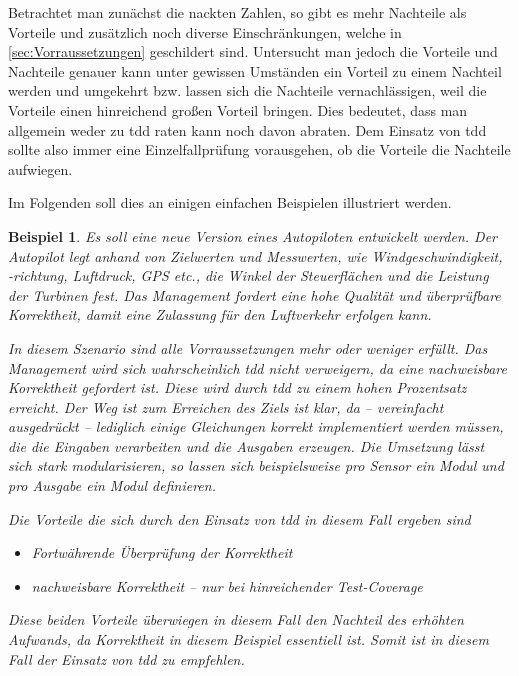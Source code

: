 \documentclass[a4paper,10pt]{scrartcl}
\newtheorem{beispiel}{Beispiel}[section]
\begin{document}
Betrachtet man zunächst die nackten Zahlen, so gibt es mehr Nachteile als 
Vorteile und zusätzlich noch diverse Einschränkungen, welche in \autoref{sec:Vorraussetzungen}
geschildert sind. Untersucht man jedoch die Vorteile und Nachteile genauer
kann unter gewissen Umständen ein Vorteil zu einem Nachteil werden und
umgekehrt bzw. lassen sich die Nachteile vernachlässigen, weil die Vorteile
einen hinreichend großen Vorteil bringen. Dies bedeutet, dass man allgemein 
weder zu \gls{tdd} raten kann noch davon abraten. Dem Einsatz von \gls{tdd}
sollte also immer eine Einzelfallprüfung vorausgehen, ob die Vorteile die
Nachteile aufwiegen.

Im Folgenden soll dies an einigen einfachen Beispielen illustriert werden.

\begin{beispiel}
  \textit{Es soll eine neue Version eines Autopiloten entwickelt werden. Der Autopilot 
  legt anhand von Zielwerten und Messwerten, wie Windgeschwindigkeit, -richtung, Luftdruck,
  GPS etc., die Winkel der Steuerflächen und die Leistung der Turbinen fest. Das 
  Management fordert eine hohe Qualität und überprüfbare Korrektheit, damit eine 
  Zulassung für den Luftverkehr erfolgen kann.}

  In diesem Szenario sind alle Vorraussetzungen mehr oder weniger erfüllt. Das
  Management wird sich wahrscheinlich \gls{tdd} nicht verweigern, da eine
  nachweisbare Korrektheit gefordert ist. Diese wird durch \gls{tdd} zu einem
  hohen Prozentsatz erreicht. Der Weg ist zum Erreichen des Ziels ist klar, da
  -- vereinfacht ausgedrückt -- lediglich einige Gleichungen korrekt implementiert 
  werden müssen, die die Eingaben verarbeiten und die Ausgaben erzeugen. Die Umsetzung
  lässt sich stark modularisieren, so lassen sich beispielsweise pro Sensor ein Modul
  und pro Ausgabe ein Modul definieren.

  Die Vorteile die sich durch den Einsatz von \gls{tdd} in diesem Fall ergeben sind
  \begin{itemize}
    \item Fortwährende Überprüfung der Korrektheit
    \item nachweisbare Korrektheit -- nur bei hinreichender Test-Coverage
  \end{itemize}

  Diese beiden Vorteile überwiegen in diesem Fall den Nachteil des erhöhten Aufwands,
  da Korrektheit in diesem Beispiel essentiell ist. Somit ist in diesem Fall der
  Einsatz von \gls{tdd} zu empfehlen.
\end{beispiel}
\end{document}
